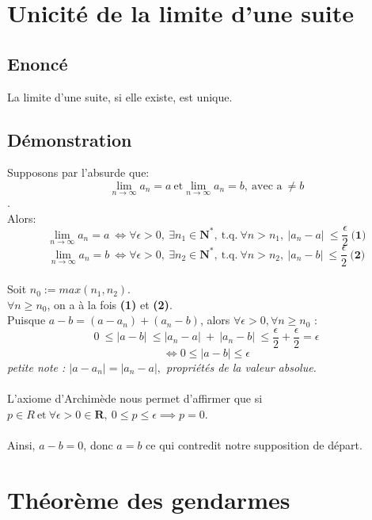 \documentclass{article}
\begin{document}
\newpage

\section{Unicité de la limite d'une suite}

\subsection{Enoncé}

La limite d'une suite, si elle existe, est unique.

\subsection{Démonstration}

Supposons par l'absurde que:
\[ \lim_{n\to\infty}a_n = a\ \text{et} \lim_{n\to\infty}a_n = b,\ \text{avec a}\ \neq b \].\\
Alors:
\[ \lim_{n\to\infty}a_n = a\ \Leftrightarrow \forall \epsilon > 0,\ \exists n_1 \in \mathbf{N^*},\ \text{t.q.}\ \forall n > n_1,\ \lvert a_n - a \lvert\ \leq \frac{\epsilon}{2}\ \textbf{(1)}\]
\[ \lim_{n\to\infty}a_n = b\ \Leftrightarrow \forall \epsilon > 0,\ \exists n_2 \in \mathbf{N^*},\ \text{t.q.}\ \forall n > n_2,\ \lvert a_n - b \lvert\ \leq \frac{\epsilon}{2}\ \textbf{(2)}\]\\
Soit $ n_0 := max(n_1, n_2) $.\\
$ \forall n \geq n_0 $, on a à la fois \textbf{(1)} et \textbf{(2)}.\\
Puisque $ a - b = (a - a_n) + (a_n - b) $, alors $\forall \epsilon > 0, \forall n \geq n_0 $ :\\
\[ 0\ \leq \lvert a - b \lvert\ \leq \lvert a_n - a \lvert\ +\ \lvert a_n - b \lvert\ \leq \frac{\epsilon}{2} + \frac{\epsilon}{2} = \epsilon \]
\[ \Leftrightarrow 0 \leq |a-b| \leq \epsilon \]
\textit{petite note : $ |a - a_n| = |a_n - a|, $ propriétés de la valeur absolue.}\\\\
L'axiome d'Archimède nous permet d'affirmer que si $ p \in R\ \text{et}\ \forall \epsilon > 0 \in \mathbf{R},\ 0 \leq p \leq \epsilon \implies p = 0 $. \\\\
Ainsi, $ a - b = 0 $, donc $ a = b $ ce qui contredit notre supposition de départ.

\newpage

\section{Théorème des gendarmes}
\end{document}
